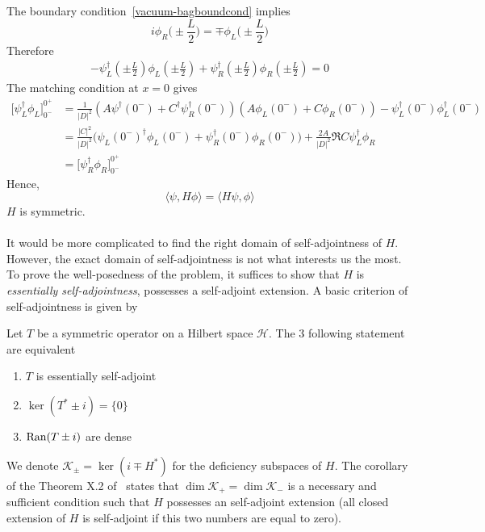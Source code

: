 The boundary condition~\cref{vacuum-bagboundcond} implies
\begin{equation*}
i\phi_R \big(\pm \frac L 2) = \mp\phi_L\big(\pm\frac L 2\big)
\end{equation*}
Therefore
\begin{equation*}
\begin{split}
- \psi_L^\dagger(\pm \frac{L}{2}) \phi_L(\pm \frac{L}{2}) + \psi_R^\dagger(\pm \frac{L}{2}) \phi_R(\pm \frac{L}{2}) = 
0
\end{split}
\end{equation*}
The matching condition at $x = 0$ gives
\begin{equation*}
\begin{split}
\big[ \psi^\dagger_L\phi_L] ^{0^+}_{0^-} & = \frac{1}{|D|^2}(A \psi^\dagger(0^-) + C^\dagger\psi^\dagger_R(0^-))(A \phi_L(0^-) + C\phi_R(0^-)) - \psi^\dagger_L(0^-)\phi^\dagger_L(0^-) \\
& = \frac{|C|^2}{|D|^2}\big(\psi_L(0^-)^\dagger\phi_L(0^-) + \psi_R^\dagger(0^-) \phi_R(0^-)\big) +
\frac{2A}{|D|^2}\Re{C\psi_L^\dagger \phi_R} \\
& = \big[ \psi^\dagger_R\phi_R] ^{0^+}_{0^-}
\end{split}
\end{equation*}
Hence, 
\begin{equation*}
\langle \psi, H \phi \rangle = \langle H \psi , \phi \rangle
\end{equation*}
$H$ is symmetric. 
\\\\
It would be more complicated to find the right domain of self-adjointness of $H$.
However, the exact domain of self-adjointness is not what interests us the most. 
To prove the well-posedness of the problem, it suffices to show that $H$ is \textit{essentially self-adjointness}, \ie possesses a self-adjoint extension.
A basic criterion of self-adjointness is given by~\cite{Reed1981}
\begin{theorem}
Let $T$ be a symmetric operator on a Hilbert space $ \mathcal{H}$. The 3 following statement are equivalent 
\begin{enumerate}
\item $T$ is essentially self-adjoint
\item $\ker(T^* \pm i) = \{0\}$
\item $\mathrm{Ran}(T \pm i )$ are dense
\end{enumerate} 
\end{theorem}
We denote  $\mathcal{K}_{\pm} = \ker (i \mp H^*)$ for the deficiency subspaces of $H$. The corollary of the Theorem X.2 of~\cite{Reed1975} states that $\dim \mathcal{K}_+ = \dim \mathcal{K}_-$ is a necessary and sufficient condition such that $H$ possesses an self-adjoint extension (all closed extension of $H$ is self-adjoint if this two numbers are equal to zero). \\\\
